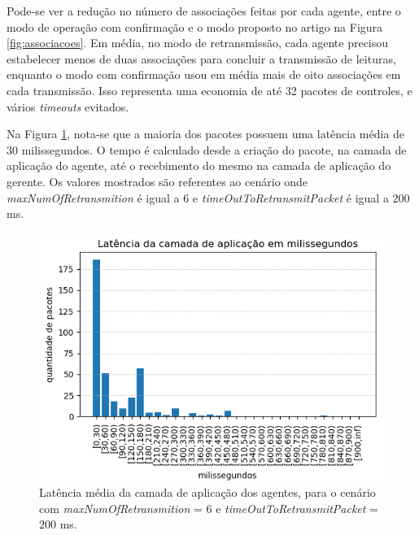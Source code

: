 Pode-se ver a redução no número de associações feitas por cada agente, entre o modo de operação com confirmação e o modo proposto no artigo na Figura \ref{fig:associacoes}. Em média, no modo de retransmissão, cada agente precisou estabelecer menos de duas associações para concluir a transmissão de leituras, enquanto o modo com confirmação usou em média mais de oito associações em cada transmissão. Isso representa uma economia de até 32 pacotes de controles, e vários \textit{timeouts} evitados. 



Na Figura \ref{fig:latencia}, nota-se que a maioria dos pacotes possuem uma latência média de $30$ milissegundos. O tempo é calculado desde a criação do pacote, na camada de aplicação do agente, até o recebimento do mesmo na camada de aplicação do gerente. Os valores mostrados são referentes ao cenário onde \textit{maxNumOfRetransmition} é igual a $6$ e  \textit{timeOutToRetransmitPacket} é igual a $200$ ms.

\begin{figure}[htbp]
\centering
\includegraphics[width=.6\textwidth]{figures/latencia.png}
\caption{Latência média da camada de aplicação dos agentes, para o cenário com \textit{maxNumOfRetransmition} = $6$ e  \textit{timeOutToRetransmitPacket} = $200$ ms.}
\label{fig:latencia} 
\end{figure}

